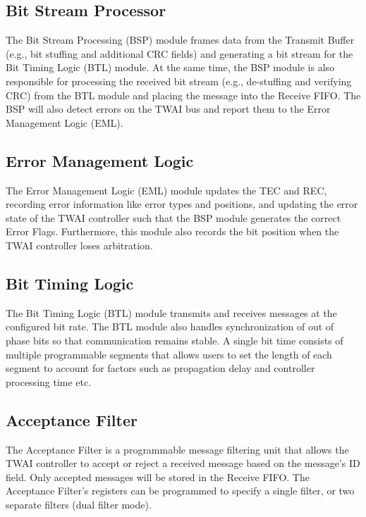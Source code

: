 \documentclass[main\_\_EN.tex]{subfiles}
\begin{document}
\subsection{Bit Stream Processor}
The Bit Stream Processing (BSP) module frames data from the Transmit Buffer (e.g., bit stuffing and additional CRC fields) and generating a bit stream for the Bit Timing Logic (BTL) module. At the same time, the BSP module is also responsible for processing the received bit stream (e.g., de-stuffing and verifying CRC) from the BTL module and placing the message into the Receive FIFO. The BSP will also detect errors on the TWAI bus and report them to the Error Management Logic (EML).

\subsection{Error Management Logic}
The Error Management Logic (EML) module updates the TEC and REC, recording error information like error types and positions, and updating the error state of the TWAI controller such that the BSP module generates the correct Error Flags. Furthermore, this module also records the bit position when the TWAI controller loses arbitration.

\subsection{Bit Timing Logic}
The Bit Timing Logic (BTL) module transmits and receives messages at the configured bit rate. The BTL module also handles synchronization of out of phase bits so that communication remains stable. A single bit time consists of multiple programmable segments that allows users to set the length of each segment to account for factors such as propagation delay and controller processing time etc.

\subsection{Acceptance Filter}
The Acceptance Filter is a programmable message filtering unit that allows the TWAI controller to accept or reject a received message based on the message's ID field. Only accepted messages will be stored in the Receive FIFO. The Acceptance Filter's registers can be programmed to specify a single filter, or two separate filters (dual filter mode).
\end{document}
